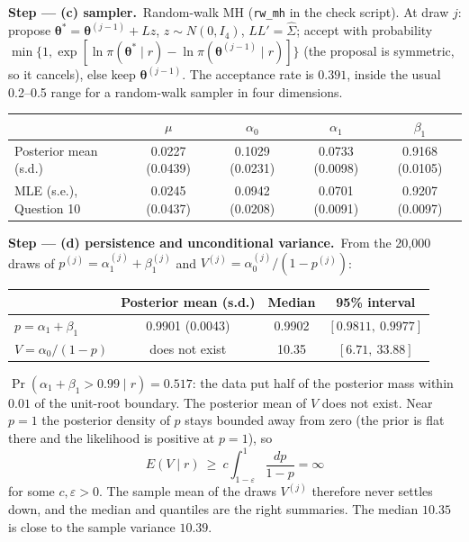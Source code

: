 \documentclass[11pt,a4paper]{article}
\newcommand{\passo}[2]{\par\smallskip\noindent\textbf{Step --- #1.}~#2}
\begin{document}
\begin{sol}
\passo{(c) sampler}{Random-walk MH (\texttt{rw\_mh} in the check script). At draw $j$: propose
$\boldsymbol\theta^*=\boldsymbol\theta^{(j-1)}+L z$, $z\sim N(0,I_4)$, $LL'=\hat\Sigma$; accept with probability
$\min\{1,\exp[\ln\pi(\boldsymbol\theta^*\mid r)-\ln\pi(\boldsymbol\theta^{(j-1)}\mid r)]\}$ (the proposal is
symmetric, so it cancels), else keep $\boldsymbol\theta^{(j-1)}$. The acceptance rate is $0.391$, inside the
usual 0.2--0.5 range for a random-walk sampler in four dimensions.}
\begin{center}\small
\begin{tabular}{lcccc}
\toprule
 & $\mu$ & $\alpha_0$ & $\alpha_1$ & $\beta_1$\\
\midrule
Posterior mean (s.d.) & 0.0227 (0.0439) & 0.1029 (0.0231) & 0.0733 (0.0098) & 0.9168 (0.0105)\\
MLE (s.e.), Question 10 & 0.0245 (0.0437) & 0.0942 (0.0208) & 0.0701 (0.0091) & 0.9207 (0.0097)\\
\bottomrule
\end{tabular}
\end{center}

\passo{(d) persistence and unconditional variance}{From the 20,000 draws of $p^{(j)}=\alpha_1^{(j)}+\beta_1^{(j)}$ and
$V^{(j)}=\alpha_0^{(j)}/(1-p^{(j)})$:}
\begin{center}\small
\begin{tabular}{lccc}
\toprule
 & Posterior mean (s.d.) & Median & 95\% interval\\
\midrule
$p=\alpha_1+\beta_1$ & 0.9901 (0.0043) & 0.9902 & $[0.9811,\ 0.9977]$\\
$V=\alpha_0/(1-p)$ & does not exist & 10.35 & $[6.71,\ 33.88]$\\
\bottomrule
\end{tabular}
\end{center}
$\Pr(\alpha_1+\beta_1>0.99\mid r)=0.517$: the data put half of the posterior mass within $0.01$ of the
unit-root boundary. The posterior mean of $V$ does not exist. Near $p=1$ the posterior density of $p$ stays
bounded away from zero (the prior is flat there and the likelihood is positive at $p=1$), so
\[ E(V\mid r)\ \ge\ c\int_{1-\varepsilon}^{1}\frac{dp}{1-p}=\infty \]
for some $c,\varepsilon>0$. The sample mean of the draws $V^{(j)}$ therefore never settles down, and the
median and quantiles are the right summaries. The median $10.35$ is close to the sample variance $10.39$.


\end{sol}
\end{document}
